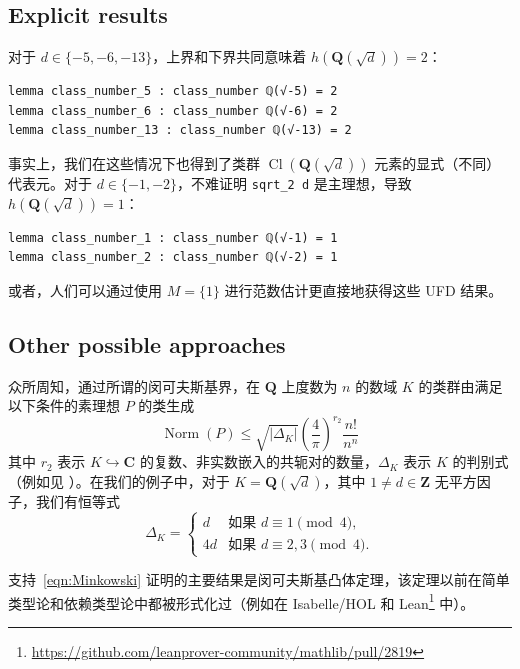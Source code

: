 \documentclass[sigplan,10pt,nonacm,
screen]{acmart} \settopmatter{printfolios=true,printccs=false,printacmref=false}
\newcommand{\QQ}{\mathbf{Q}}
\newcommand{\ZZ}{\mathbf{Z}}
\newcommand{\CC}{\mathbf{C}}
\DeclareMathOperator{\Norm}{Norm}
\DeclareMathOperator{\Cl}{Cl}
\begin{document}
\subsection{Explicit results}\label{sec:class_group_expl}

对于 $d\in\{-5,-6,-13\}$，上界和下界共同意味着 $h(\QQ(\sqrt{d}))=2$：
\begin{lstlisting}
lemma class_number_5 : class_number ℚ(√-5) = 2
lemma class_number_6 : class_number ℚ(√-6) = 2
lemma class_number_13 : class_number ℚ(√-13) = 2
\end{lstlisting}

事实上，我们在这些情况下也得到了类群 $\Cl(\QQ(\sqrt{d}))$ 元素的显式（不同）代表元。对于 $d \in \{-1,-2\}$，不难证明 \lstinline{sqrt_2 d} 是主理想，导致 $h(\QQ(\sqrt{d}))=1$：
\begin{lstlisting}
lemma class_number_1 : class_number ℚ(√-1) = 1
lemma class_number_2 : class_number ℚ(√-2) = 1
\end{lstlisting}

或者，人们可以通过使用 $M= \{1\}$ 进行范数估计更直接地获得这些 UFD 结果。

\subsection{Other possible approaches}\label{sec:OtherApproaches}

众所周知，通过所谓的闵可夫斯基界，在 $\QQ$ 上度数为 $n$ 的数域 $K$ 的类群由满足以下条件的素理想 $P$ 的类生成
\begin{equation}\label{eqn:Minkowski}
\Norm(P) \leq \sqrt{|\Delta_K|}\left(\dfrac{4}{\pi}\right)^{r_2}\dfrac{n!}{n^n}
\end{equation}
其中 $r_2$ 表示 $K \hookrightarrow \CC$ 的复数、非实数嵌入的共轭对的数量，$\Delta_K$ 表示 $K$ 的判别式（例如见 \cite[Section I.5]{Neukirch}）。在我们的例子中，对于 $K=\QQ(\sqrt{d})$，其中 $1\not=d \in \ZZ$ 无平方因子，我们有恒等式
\begin{equation*}
\Delta_K = \left\lbrace
\begin{array}{ll}
d & \text{如果 } d \equiv 1 \pmod 4, \\
4d & \text{如果 } d \equiv 2,3 \pmod 4.
\end{array}
\right.
\end{equation*}

支持~\eqref{eqn:Minkowski} 证明的主要结果是闵可夫斯基凸体定理，该定理以前在简单类型论和依赖类型论中都被形式化过（例如在 Isabelle/HOL \cite{Minkowskis_Theorem-AFP} 和 Lean\footnote{\url{https://github.com/leanprover-community/mathlib/pull/2819}} 中）。
\end{document}
